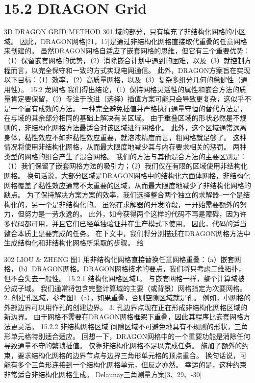 \documentclass[UTF8,11pt,a4paper,openany,fontset=fandol]{ctexbook}
\begin{document}
\section{15.2 DRAGON Grid}
3D DRAGON GRID METHOD 301 域的部分，只有填充了非结构化网格的小区域。 因此，DRAGON网格[21，17]是通过非结构化网格直接取代重叠的任意网格来创建的。 虽然DRAGON网格自适应了嵌套网格的思维，但它有三个重要优势：（1）保留嵌套网格的优势，（2）消除嵌合计划中遇到的困难，以及（3）就控制方程而言，以完全保守和一致的方式实现电网通信。 此外，DRAGON方案旨在实现以下目标：（1）效率，（2）高质量网格，以及（3）复杂多组分几何的稳健性（通用性）。 15.2 龙网格 我们得出结论，（1）保持网格灵活性的属性和嵌合方法的质量肯定要保留，（2）专注于改进（选择）插值方案可能只会导致更复杂，这似乎不是一个富有成效的方法。 一种完全避免插值并严格执行通量守恒的替代方法是，在与域的其余部分相同的基础上解决有关区域。 由于重叠区域的形状必然是不规则的，非结构化网格方法最适合对该区域进行网格化。 此外，这个区域通常远离身体，黏性效应不如非黏性效应重要，就溶液精度而言，粗网格就足够了。 这种情况将使用非结构化网格，从而最大限度地减少其与内存要求相关的惩罚。 两种类型的网格的组合产生了混合网格。 我们的方法与其他混合方法的主要区别是：（1）我们保留了嵌套网格方法的吸引力；（2）我们仅在有限的区域使用非结构化网格。 换句话说，大部分区域是DRAGON网格中的结构化六面体网格，非结构化网格覆盖了黏性效应通常不太重要的区域，从而最大限度地减少了非结构化网格的缺点。 为了保持解决方案方案的效率，我们选择整合两个独立的求解器--一个是结构化的，另一个是非结构化的。 虽然在求解器的开发阶段，一开始需要额外的努力，但努力是一劳永逸的。 此外，如今获得两个这样的代码不再是障碍，因为许多代码都可用，并且它们已经单独验证并在生产模式下使用。 因此，代码的适当整合本质上是要完成的任务。 在下文中，我们将分别描述在DRAGON网格方法中生成结构化和非结构化网格所采取的步骤。 给

302 LIOU \& ZHENG 图1 用非结构化网格直接替换任意网格重叠：（a）嵌套网格，（b）DRAGON网格。DRAGON网格技术的要点，我们将只考虑二维拓扑，但不会失去一般性。 15.2.1 结构化网格区域1。 与嵌套网格一样，整个计算域被分成子域。 我们通常将包含完整计算域的主要（或背景）网格指定为次要网格。 2. 创建孔区域，参考图1（a），如果重叠，否则空隙区域就是孔。 例如，小网格的外部边界可以用作孔的创建边界。 3. 孔边界点现在正在形成非结构化网格区域的新边界。 由于网格不需要在DRAGON网格框架下重叠，因此其程序比嵌套网格方法更灵活。 15.2.2 非结构网格区域 间隙区域不可避免地具有不规则的形状，三角形单元格特别适合适应。 回想一下，DRAGON网格中的一个重要功能是消除任何导致通量不守的繁琐插值。 仅靠非结构化网格不足以完成任务。 施加了额外的约束，要求结构化网格的边界节点与边界三角形单元格的顶点重合。 换句话说，可能有多个三角形连接到一个结构化网格单元，但反之亦然。 幸运的是，这种约束非常适合非结构化网格生成。 Delaunay三角测量方案[3、29、-30]
\end{document}
